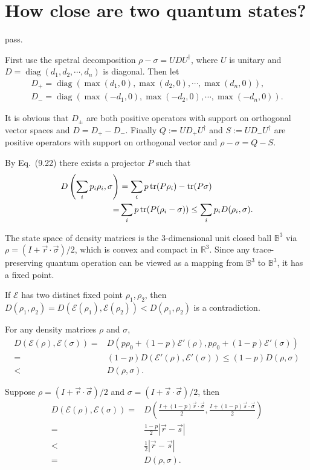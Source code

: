 \section{How close are two quantum states?}

\ex pass.

\ex First use the spetral decomposition $\rho-\sigma = UDU^\dagger$, where $U$ is unitary and $D=\operatorname{diag}(d_1,d_2,\cdots,d_n)$ is diagonal.
Then let 
$$\begin{gathered}
    D_+=\operatorname{diag}(\max(d_1,0),\max(d_2,0),\cdots,\max(d_n,0)), \\
    D_-=\operatorname{diag}(\max(-d_1,0),\max(-d_2,0),\cdots,\max(-d_n,0)).
\end{gathered}$$

It is obvious that $D_\pm$ are both positive operators with support on orthogonal vector spaces and $D=D_+ - D_-$.
Finally $Q:=UD_+U^\dagger$ and $S:=UD_-U^\dagger$ are positive operators with support on orthogonal vector and $\rho-\sigma=Q-S$.

\ex By Eq.~(9.22) there exists a projector $P$ such that
$$\begin{aligned}
D\left(\sum_ip_i\rho_i, \sigma\right)
& = \sum_ip\operatorname{tr}(P\rho_i)-\operatorname{tr}(P\sigma)
\\ = & \sum_ip\operatorname{tr}(P(\rho_i - \sigma))
\le \sum_ip_iD(\rho_i, \sigma).
\end{aligned}$$

\ex The state space of density matrices is the 3-dimensional unit closed ball $\mathbb{B}^3$ via $\rho = (I + \vec{r} \cdot \vec{\sigma}) / 2$, which is convex and compact in $\mathbb{R}^3$.
Since any trace-preserving quantum operation can be viewed as a mapping from $\mathbb{B}^3$ to $\mathbb{B}^3$, it has a fixed point.

\ex If $\mathcal{E}$ has two distinct fixed point $\rho_1,\rho_2$, then $D(\rho_1,\rho_2) = D(\mathcal{E}(\rho_1), \mathcal{E}(\rho_2)) < D(\rho_1,\rho_2)$ is a contradiction.

\ex For any density matrices $\rho$ and $\sigma$,
$$\begin{aligned}
D(\mathcal{E}(\rho), \mathcal{E}(\sigma))
= & D(p\rho_0+(1-p)\mathcal{E}'(\rho), p\rho_0+(1-p)\mathcal{E}'(\sigma))
\\ = & (1-p)D(\mathcal{E}'(\rho), \mathcal{E}'(\sigma))
\le (1-p)D(\rho, \sigma)
\\ < & D(\rho, \sigma).
\end{aligned}$$

\ex Suppose $\rho=(I+\vec{r}\cdot\vec{\sigma})/2$ and $\sigma=(I+\vec{s}\cdot\vec{\sigma})/2$, then
$$\begin{aligned}
D(\mathcal{E}(\rho), \mathcal{E}(\sigma))
= & D\left(\frac{I+(1-p)\vec{r}\cdot\vec{\sigma}}{2},\frac{I+(1-p)\vec{s}\cdot\vec{\sigma}}{2}\right)
\\ = & \frac{1-p}{2}\left|\vec{r}-\vec{s}\right|
\\ < & \frac{1}{2}\left|\vec{r}-\vec{s}\right|
\\ = & D(\rho, \sigma).
\end{aligned}$$

